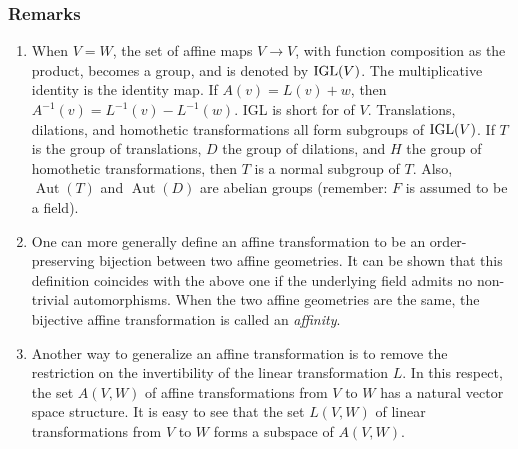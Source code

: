 \documentclass[12pt]{article}
\begin{document}
\subsubsection*{Remarks}
\begin{enumerate}
\item When $V=W$, the set of affine maps $V\to V$, with function composition as the product, becomes a group, and is denoted by ${\rm IGL}(V)$.  The multiplicative identity is the identity map.  If $A(v)=L(v)+w$, then $A^{-1}(v)=L^{-1}(v)-L^{-1}(w)$.  IGL is short for \emph{} of $V$.  Translations, dilations, and homothetic transformations all form subgroups of ${\rm IGL}(V)$.  If $T$ is the group of translations, $D$ the group of dilations, and $H$ the group of homothetic transformations, then $T$ is a normal subgroup of $T$.  Also, $\operatorname{Aut}(T)$ and $\operatorname{Aut}(D)$ are abelian groups (remember: $F$ is assumed to be a field).
\item One can more generally define an affine transformation to be an order-preserving bijection between two affine geometries.  It can be shown that this definition coincides with the above one if the underlying field admits no non-trivial automorphisms.  When the two affine geometries are the same, the bijective affine transformation is called an \emph{affinity}.
\item Another way to generalize an affine transformation is to remove the restriction on the invertibility of the linear transformation $L$.  In this respect, the set $A(V,W)$ of affine transformations from $V$ to $W$ has a natural vector space structure.  It is easy to see that the set $L(V,W)$ of linear transformations from $V$ to $W$ forms a subspace of $A(V,W)$.
\end{enumerate}
\end{document}

